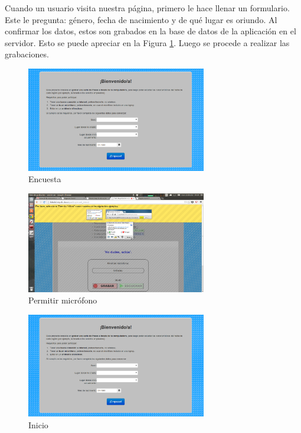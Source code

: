 \documentclass[11pt,a4paper,twoside]{tesis}
\begin{document}
Cuando un usuario visita nuestra página, primero le hace llenar un formulario. Este le pregunta: género, fecha de nacimiento y de qué lugar es oriundo. Al confirmar los datos, estos son grabados en la base de datos de la aplicación en el servidor. Esto se puede apreciar en la Figura \ref{figEncuesta}. Luego se procede a realizar las grabaciones. 

\begin{figure}[h!]
    \centerline{\includegraphics[width=0.7\textwidth]{pag-inicio2} }
    \caption{Encuesta}
    \label{figEncuesta}
\end{figure}

\begin{figure}[h!]
    \centerline{\includegraphics[width=0.7\textwidth]{pag-allow1} }
    \caption{Permitir micrófono}
    \label{allowmic}
\end{figure}

\begin{figure}[h!]
    \centerline{\includegraphics[width=0.7\textwidth]{pag-inicio2} }
    \caption{Inicio}
    \label{inicio}
\end{figure}
\end{document}
